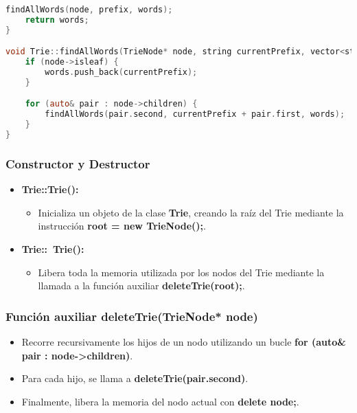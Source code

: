 \documentclass[corference]{IEEEtran}
\begin{document}
\begin{flushleft}
\begin{lstlisting}[language=C, style=mystyle, caption={Código de la Clase trie}]
    findAllWords(node, prefix, words);
    return words;
}

void Trie::findAllWords(TrieNode* node, string currentPrefix, vector<string>& words) {
    if (node->isleaf) {
        words.push_back(currentPrefix);
    }

    for (auto& pair : node->children) {
        findAllWords(pair.second, currentPrefix + pair.first, words);
    }
}
            \end{lstlisting}

            \subsubsection{Constructor y Destructor}
                \begin{itemize}
                    \item \textbf{Trie::Trie():} 
                    \begin{itemize}
                        \item Inicializa un objeto de la clase \textbf{Trie}, creando la raíz del Trie mediante la instrucción \textbf{root = new TrieNode();}.
                    \end{itemize}
                    \item \textbf{Trie::~Trie():} 
                    \begin{itemize}
                        \item Libera toda la memoria utilizada por los nodos del Trie mediante la llamada a la función auxiliar \textbf{deleteTrie(root);}.
                    \end{itemize}
                \end{itemize}
                
            \subsubsection{Función auxiliar deleteTrie(TrieNode* node)}
                \begin{itemize}
                    \item Recorre recursivamente los hijos de un nodo utilizando un bucle \textbf{for (auto\& pair : node->children)}.
                    \item Para cada hijo, se llama a \textbf{deleteTrie(pair.second)}.
                    \item Finalmente, libera la memoria del nodo actual con \textbf{delete node;}.
                \end{itemize}
                

\end{flushleft}
\end{document}
